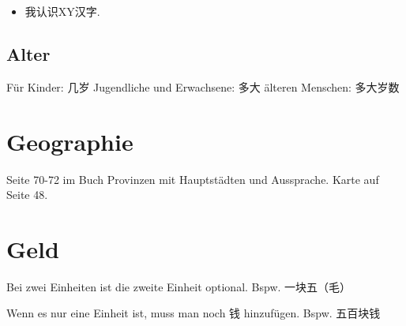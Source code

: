 \documentclass[UTF8]{ctexart}
\begin{document}
\begin{itemize}
    \item 我认识XY汉字.
\end{itemize}

\subsection{Alter}

Für Kinder: 几岁
Jugendliche und Erwachsene: 多大
älteren Menschen: 多大岁数

\section{Geographie}

Seite 70-72 im Buch Provinzen mit Hauptstädten und Aussprache. Karte auf Seite 48.

\section{Geld}

Bei zwei Einheiten ist die zweite Einheit optional. Bspw. 一块五（毛）

Wenn es nur eine Einheit ist, muss man noch 钱 hinzufügen. Bspw. 五百块钱
\end{document}

